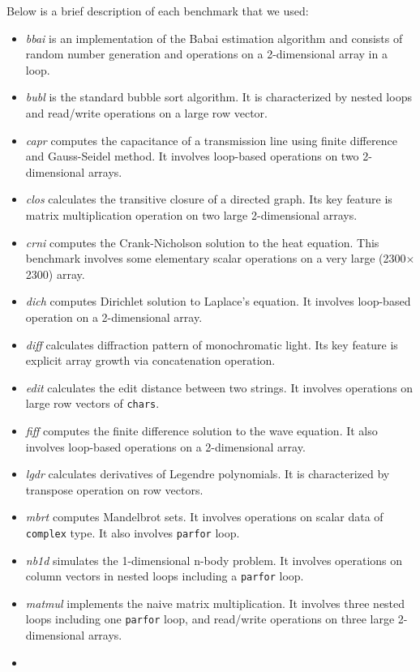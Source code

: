 Below is a brief description of each benchmark that we used: \begin{itemize}
\item \emph{bbai} is an implementation of the Babai estimation algorithm and
consists of random number generation and operations on a 2-dimensional array in
a loop.  \item \emph{bubl} is the standard bubble sort algorithm. It is
characterized by nested loops and read/write operations on a large row vector.
\item \emph{capr} computes the capacitance of a transmission line using finite
difference and Gauss-Seidel method. It involves loop-based operations on two
2-dimensional arrays.  \item \emph{clos} calculates the transitive closure of a
directed graph. Its key feature is matrix multiplication operation on two large
2-dimensional arrays.  \item \emph{crni} computes the Crank-Nicholson solution
to the heat equation.  This benchmark involves some elementary scalar operations
on a very large (2300$\times$2300) array.  \item \emph{dich} computes Dirichlet
solution to Laplace's equation. It involves loop-based operation on a
2-dimensional array.  \item \emph{diff} calculates diffraction pattern of
monochromatic light. Its key feature is explicit array growth via concatenation
operation.  \item \emph{edit} calculates the edit distance between two strings.
It involves operations on large row vectors of \texttt{chars}.  \item
\emph{fiff} computes the finite difference solution to the wave equation.  It
also involves loop-based operations on a 2-dimensional array.  \item \emph{lgdr}
calculates derivatives of Legendre polynomials. It is characterized by transpose
operation on row vectors.  \item \emph{mbrt} computes Mandelbrot sets. It
involves operations on scalar data of \texttt{complex} type. It also involves
\texttt{parfor} loop.  \item \emph{nb1d} simulates the 1-dimensional n-body
problem. It involves operations on column vectors in nested loops including a
\texttt{parfor} loop.  \item \emph{matmul} implements the naive matrix
multiplication. It involves three nested loops including one \texttt{parfor}
loop, and read/write operations on three large 2-dimensional arrays.  \item

\end{itemize}
